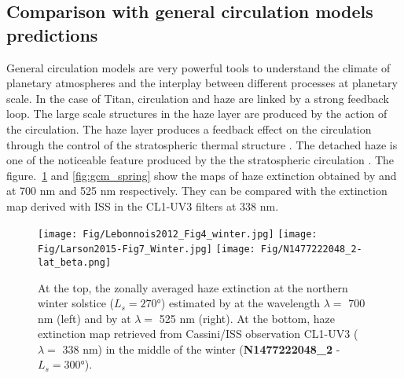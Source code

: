 \subsection{Comparison with general circulation models predictions}

General circulation models are very powerful tools to understand the climate of planetary atmospheres and the
interplay between different processes at planetary scale. In the case of Titan, circulation and haze are linked
by a strong feedback loop. The large scale structures in the haze layer are produced by the action of the
circulation. The haze layer produces a feedback effect on the circulation through the control of the stratospheric
thermal structure \citep{Rannou2004}. The detached haze is one of the noticeable feature produced by the the
stratospheric circulation \citep{Rannou2002, Lebonnois2012, Larson2015}. The figure.~\ref{fig:gcm_winter}
and \ref{fig:gcm_spring} show the maps of haze extinction obtained by \cite{Lebonnois2012} and
\cite{Larson2015} at 700 nm and 525 nm respectively. They can be compared with the extinction map derived
with ISS in the CL1-UV3 filters at 338 nm.

\begin{figure}[!ht]
    \centering
    \texttt{[image: Fig/Lebonnois2012\_Fig4\_winter.jpg]}
    \texttt{[image: Fig/Larson2015-Fig7\_Winter.jpg]}
    \texttt{[image: Fig/N1477222048\_2-lat\_beta.png]}
    \caption{At the top, the zonally averaged haze extinction at the northern winter solstice
        ($L_s = \ang{270}$) estimated by \cite{Lebonnois2012} at the wavelength $\lambda = $ 700 nm (left)
        and by \cite{Larson2015} at $\lambda = $ 525 nm (right). At the bottom, haze extinction map
        retrieved from Cassini/ISS observation CL1-UV3 ($\lambda = $ 338 nm) in the middle of the winter
        (\textbf{N1477222048\_2} - $L_s = \ang{300}$).}
    \label{fig:gcm_winter}
\end{figure}

